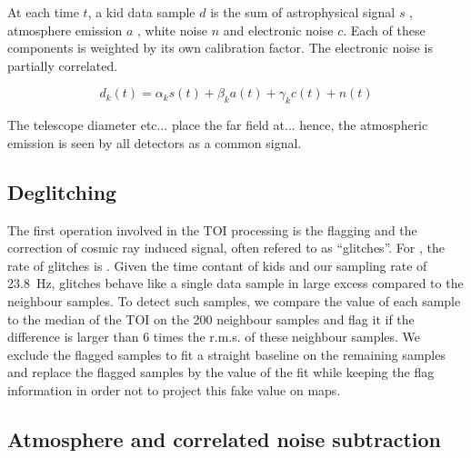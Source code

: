 

At each time $t$, a kid data sample $d$ is the sum of astrophysical signal $s$ ,
atmosphere emission $a$ , white noise $n$ and electronic noise $c$. Each of
these components is weighted by its own calibration factor. The electronic noise
is partially correlated.

\begin{equation}
d_k(t) = \alpha_k s(t) + \beta_k a(t) + \gamma_k c(t) + n(t)
\label{eq:signal_model_1}
\end{equation}

The telescope diameter etc... place the far field at... hence, the atmospheric
emission is seen by all detectors as a common signal.

\subsection{Deglitching}

The first operation involved in the TOI processing is the flagging and the
correction of cosmic ray induced signal, often refered to as ``glitches''. For
\nika, the rate of glitches is . Given the  time contant of
kids and our sampling rate of 23.8~Hz, glitches behave like a single data sample
in large excess compared to the neighbour samples. To detect such samples, we
compare the value of each sample to the median of the TOI on the 200 
neighbour samples and flag it if the difference is larger than 6  times
the r.m.s. of these neighbour samples. We exclude the flagged samples to fit a
straight baseline on the remaining samples and replace the flagged samples by
the value of the fit while keeping the flag information in order not to project
this fake value on maps.

\subsection{Atmosphere and correlated noise subtraction}
\label{se:point_source_decorr}

